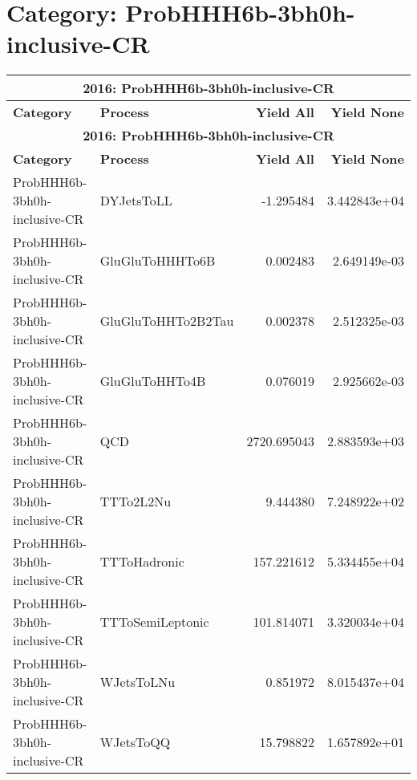 \documentclass{article}
\begin{document}
\section*{Category: ProbHHH6b-3bh0h-inclusive-CR}
\begin{longtable}[c]{|l|l|r|r|}
\hline
\multicolumn{4}{|c|}{\textbf{2016: ProbHHH6b-3bh0h-inclusive-CR}} \\
\hline
\textbf{Category} & \textbf{Process} & \textbf{Yield All} & \textbf{Yield None} \\
\hline
\endfirsthead
\hline
\multicolumn{4}{|c|}{\textbf{2016: ProbHHH6b-3bh0h-inclusive-CR}} \\
\hline
\textbf{Category} & \textbf{Process} & \textbf{Yield All} & \textbf{Yield None} \\
\hline
\endhead
ProbHHH6b-3bh0h-inclusive-CR & DYJetsToLL & -1.295484 & 3.442843e+04 \\
\hline
ProbHHH6b-3bh0h-inclusive-CR & GluGluToHHHTo6B & 0.002483 & 2.649149e-03 \\
\hline
ProbHHH6b-3bh0h-inclusive-CR & GluGluToHHTo2B2Tau & 0.002378 & 2.512325e-03 \\
\hline
ProbHHH6b-3bh0h-inclusive-CR & GluGluToHHTo4B & 0.076019 & 2.925662e-03 \\
\hline
ProbHHH6b-3bh0h-inclusive-CR & QCD & 2720.695043 & 2.883593e+03 \\
\hline
ProbHHH6b-3bh0h-inclusive-CR & TTTo2L2Nu & 9.444380 & 7.248922e+02 \\
\hline
ProbHHH6b-3bh0h-inclusive-CR & TTToHadronic & 157.221612 & 5.334455e+04 \\
\hline
ProbHHH6b-3bh0h-inclusive-CR & TTToSemiLeptonic & 101.814071 & 3.320034e+04 \\
\hline
ProbHHH6b-3bh0h-inclusive-CR & WJetsToLNu & 0.851972 & 8.015437e+04 \\
\hline
ProbHHH6b-3bh0h-inclusive-CR & WJetsToQQ & 15.798822 & 1.657892e+01 \\
\hline
\end{longtable}
\end{document}
